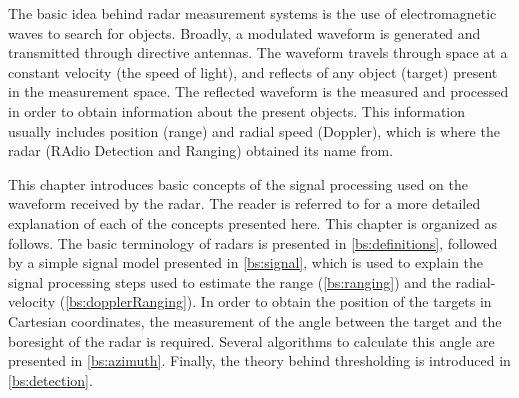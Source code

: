 The basic idea behind radar measurement systems is the use of electromagnetic waves to search for objects. Broadly, a modulated waveform is generated and transmitted through directive antennas. The waveform travels through space at a constant velocity (the speed of light), and reflects of any object (target) present in the measurement space. The reflected waveform is the measured and processed in order to obtain information about the present objects. This information usually includes position (range) and radial speed (Doppler), which is where the radar (RAdio Detection and Ranging) obtained its name from. 

This chapter introduces basic concepts of the signal processing used on the waveform received by the radar. The reader is referred to \cite{mahafza_radar_2002} for a more detailed explanation of each of the concepts presented here. This chapter is organized as follows. The basic terminology of radars is presented in \cref{bs:definitions}, followed by a simple signal model presented in  \cref{bs:signal}, which is used to explain the signal processing steps used to estimate the range (\cref{bs:ranging}) and the radial-velocity (\cref{bs:dopplerRanging}). In order to obtain the position of the targets in Cartesian coordinates, the measurement of the angle between the target and the boresight of the radar is required. Several algorithms to calculate this angle are presented in \cref{bs:azimuth}. Finally, the theory behind thresholding is introduced in \cref{bs:detection}. 


